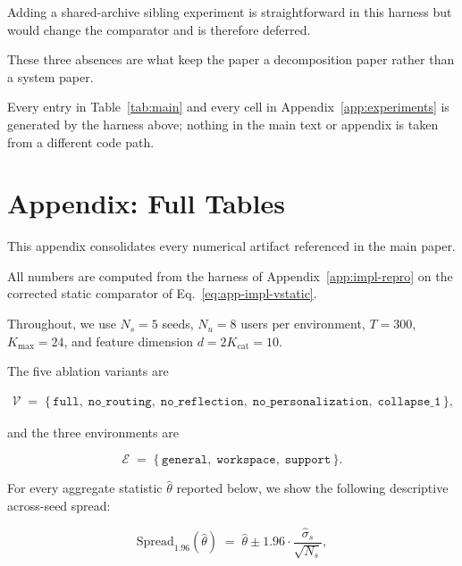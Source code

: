 \documentclass{article} %
\begin{document}
Adding a shared-archive sibling experiment is straightforward in this harness but would change the comparator and is therefore deferred.

These three absences are what keep the paper a decomposition paper rather than a system paper.

Every entry in Table~\ref{tab:main} and every cell in Appendix~\ref{app:experiments} is generated by the harness above; nothing in the main text or appendix is taken from a different code path.

\section{Appendix: Full Tables}

\label{app:tables}

This appendix consolidates every numerical artifact referenced in the main paper.

All numbers are computed from the harness of Appendix~\ref{app:impl-repro} on the corrected static comparator of Eq.~\eqref{eq:app-impl-vstatic}.

Throughout, we use \(N_s=5\) seeds, \(N_u=8\) users per environment, \(T=300\),
\(K_{\max}=24\), and feature dimension \(d=2K_{\mathrm{cat}}=10\).

The five ablation variants are

\begin{equation}
\label{eq:app-tab-variants}
\begin{aligned}
\mathcal{V} \;=\; \{\,\texttt{full},\; \texttt{no\_routing},\; \texttt{no\_reflection},\; \texttt{no\_personalization},\; \texttt{collapse\_1}\,\},
\end{aligned}
\end{equation}

and the three environments are

\begin{equation}
\label{eq:app-tab-envs}
\mathcal{E} \;=\; \{\,\texttt{general},\; \texttt{workspace},\; \texttt{support}\,\}.
\end{equation}

For every aggregate statistic \(\widehat\theta\) reported below, we show the
following descriptive across-seed spread:

\begin{equation}
\label{eq:app-tab-spread}
\mathrm{Spread}_{1.96}(\widehat\theta)
\;=\;
\widehat\theta \pm 1.96\cdot \frac{\widehat\sigma_s}{\sqrt{N_s}},
\end{equation}
\end{document}
